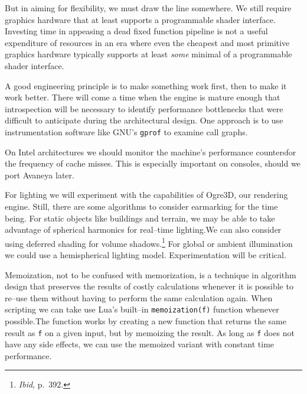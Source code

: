 But in aiming for flexibility, we must draw the line somewhere. We still require graphics hardware that at least supports a programmable shader interface. Investing time in appeasing a dead fixed function pipeline is not a useful expenditure of resources in an era where even the cheapest and most primitive graphics hardware typically supports at least {\it some} minimal of a programmable shader interface.


A good engineering principle is to make something work first, then to make it work better. There will come a time when the engine is mature enough that introspection will be necessary to identify performance bottlenecks that were difficult to anticipate during the architectural design. One approach is to use instrumentation software like GNU's {\tt gprof} to examine call graphs.

On Intel architectures we should monitor the machine's performance counters for the frequency of cache misses. This is especially important on consoles, should we port Avaneya later.


For lighting we will experiment with the capabilities of Ogre3D, our rendering engine. Still, there are some algorithms to consider earmarking for the time being. For static objects like buildings and terrain, we may be able to take advantage of spherical harmonics for real--time lighting. We can also consider using deferred shading for volume shadows.\footnote{{\it Ibid}, p.~392.} For global or ambient illumination we could use a hemispherical lighting model. Experimentation will be critical.


Memoization, not to be confused with memorization, is a technique in algorithm design that preserves the results of costly calculations whenever it is possible to re--use them without having to perform the same calculation again. When scripting we can take use Lua's built--in {\tt memoization(f)} function whenever possible. The function works by creating a new function that returns the same result as {\tt f} on a given input, but by memoizing the result. As long as {\tt f} does not have any side effects, we can use the memoized variant with constant time performance.

